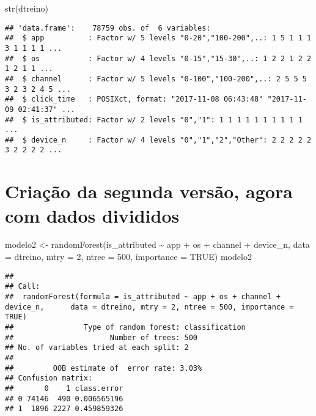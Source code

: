 \documentclass[
]{article}
\newenvironment{Shaded}{\begin{snugshade}}{\end{snugshade}}
\newcommand{\AttributeTok}[1]{\textcolor[rgb]{0.77,0.63,0.00}{#1}}
\newcommand{\ConstantTok}[1]{\textcolor[rgb]{0.00,0.00,0.00}{#1}}
\newcommand{\DecValTok}[1]{\textcolor[rgb]{0.00,0.00,0.81}{#1}}
\newcommand{\FunctionTok}[1]{\textcolor[rgb]{0.00,0.00,0.00}{#1}}
\newcommand{\NormalTok}[1]{#1}
\newcommand{\OtherTok}[1]{\textcolor[rgb]{0.56,0.35,0.01}{#1}}
\newcommand{\SpecialCharTok}[1]{\textcolor[rgb]{0.00,0.00,0.00}{#1}}
\begin{document}
\begin{Shaded}
\begin{Highlighting}[]
\FunctionTok{str}\NormalTok{(dtreino)}
\end{Highlighting}
\end{Shaded}

\begin{verbatim}
## 'data.frame':    78759 obs. of  6 variables:
##  $ app          : Factor w/ 5 levels "0-20","100-200",..: 1 5 1 1 1 3 1 1 1 1 ...
##  $ os           : Factor w/ 4 levels "0-15","15-30",..: 1 2 2 1 2 2 1 2 1 1 ...
##  $ channel      : Factor w/ 5 levels "0-100","100-200",..: 2 5 5 5 3 2 3 2 4 5 ...
##  $ click_time   : POSIXct, format: "2017-11-08 06:43:48" "2017-11-09 02:41:37" ...
##  $ is_attributed: Factor w/ 2 levels "0","1": 1 1 1 1 1 1 1 1 1 1 ...
##  $ device_n     : Factor w/ 4 levels "0","1","2","Other": 2 2 2 2 2 3 2 2 2 2 ...
\end{verbatim}

\hypertarget{criauxe7uxe3o-da-segunda-versuxe3o-agora-com-dados-divididos}{%
\section{Criação da segunda versão, agora com dados
divididos}\label{criauxe7uxe3o-da-segunda-versuxe3o-agora-com-dados-divididos}}

\begin{Shaded}
\begin{Highlighting}[]
\NormalTok{modelo2 }\OtherTok{\textless{}{-}} \FunctionTok{randomForest}\NormalTok{(is\_attributed }\SpecialCharTok{\textasciitilde{}}\NormalTok{ app }\SpecialCharTok{+}\NormalTok{ os }\SpecialCharTok{+}\NormalTok{ channel }\SpecialCharTok{+}\NormalTok{ device\_n,}
                        \AttributeTok{data =}\NormalTok{ dtreino,}
                        \AttributeTok{mtry =} \DecValTok{2}\NormalTok{,}
                        \AttributeTok{ntree =} \DecValTok{500}\NormalTok{,}
                        \AttributeTok{importance =} \ConstantTok{TRUE}\NormalTok{)}
\NormalTok{modelo2}
\end{Highlighting}
\end{Shaded}

\begin{verbatim}
## 
## Call:
##  randomForest(formula = is_attributed ~ app + os + channel + device_n,      data = dtreino, mtry = 2, ntree = 500, importance = TRUE) 
##                Type of random forest: classification
##                      Number of trees: 500
## No. of variables tried at each split: 2
## 
##         OOB estimate of  error rate: 3.03%
## Confusion matrix:
##       0    1 class.error
## 0 74146  490 0.006565196
## 1  1896 2227 0.459859326
\end{verbatim}
\end{document}
